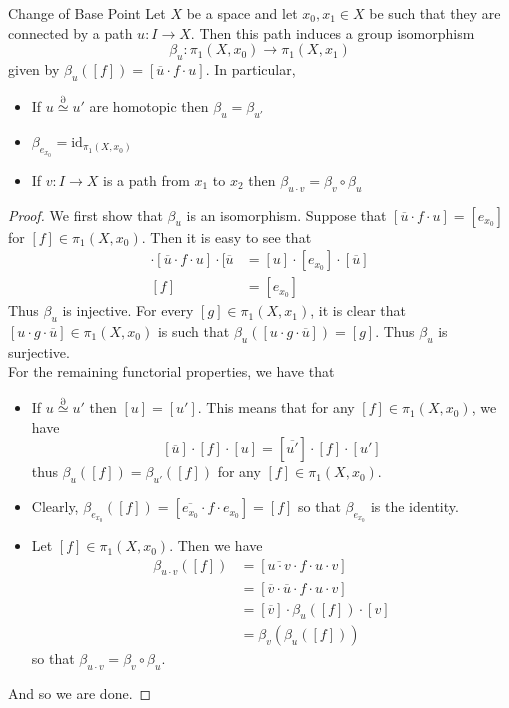 \documentclass[a4paper]{article}
\begin{document}
\begin{thm}{Change of Base Point}{} Let $X$ be a space and let $x_0,x_1\in X$ be such that they are connected by a path $u:I\to X$. Then this path induces a group isomorphism $$\beta_u:\pi_1(X,x_0)\to\pi_1(X,x_1)$$ given by $\beta_u([f])=[\overline{u}\cdot f\cdot u]$. In particular, 
\begin{itemize}
\item If $u\overset{\partial}{\simeq} u'$ are homotopic then $\beta_u=\beta_{u'}$
\item $\beta_{e_{x_0}}=\text{id}_{\pi_1(X,x_0)}$
\item If $v:I\to X$ is a path from $x_1$ to $x_2$ then $\beta_{u\cdot v}=\beta_v\circ\beta_u$
\end{itemize} 
\begin{proof}
We first show that $\beta_u$ is an isomorphism. Suppose that $[\overline{u}\cdot f\cdot u]=[e_{x_0}]$ for $[f]\in\pi_1(X,x_0)$. Then it is easy to see that 
\begin{align*}
[u]\cdot[\overline{u}\cdot f\cdot u]\cdot[\overline{u}&=[u]\cdot[e_{x_0}]\cdot[\overline{u}]\\
[f]&=[e_{x_0}]
\end{align*}
Thus $\beta_u$ is injective. For every $[g]\in\pi_1(X,x_1)$, it is clear that $[u\cdot g\cdot\overline{u}]\in\pi_1(X,x_0)$ is such that $\beta_u([u\cdot g\cdot\overline{u}])=[g]$. Thus $\beta_u$ is surjective. \\

For the remaining functorial properties, we have that 
\begin{itemize}
\item If $u\overset{\partial}{\simeq} u'$ then $[u]=[u']$. This means that for any $[f]\in\pi_1(X,x_0)$, we have $$[\overline{u}]\cdot[f]\cdot[u]=[\overline{u'}]\cdot[f]\cdot[u']$$ thus $\beta_u([f])=\beta_{u'}([f])$ for any $[f]\in\pi_1(X,x_0)$. 
\item Clearly, $\beta_{e_{x_0}}([f])=[\overline{e_{x_0}}\cdot f\cdot e_{x_0}]=[f]$ so that $\beta_{e_{x_0}}$ is the identity. 
\item Let $[f]\in\pi_1(X,x_0)$. Then we have 
\begin{align*}
\beta_{u\cdot v}([f])&=[\overline{u\cdot v}\cdot f\cdot u\cdot v]\\
&=[\overline{v}\cdot\overline{u}\cdot f\cdot u\cdot v]\\
&=[\overline{v}]\cdot\beta_u([f])\cdot[v]\\
&=\beta_v(\beta_u([f]))
\end{align*}
so that $\beta_{u\cdot v}=\beta_v\circ\beta_u$. 
\end{itemize}
And so we are done. 
\end{proof}
\end{thm}
\end{document}
